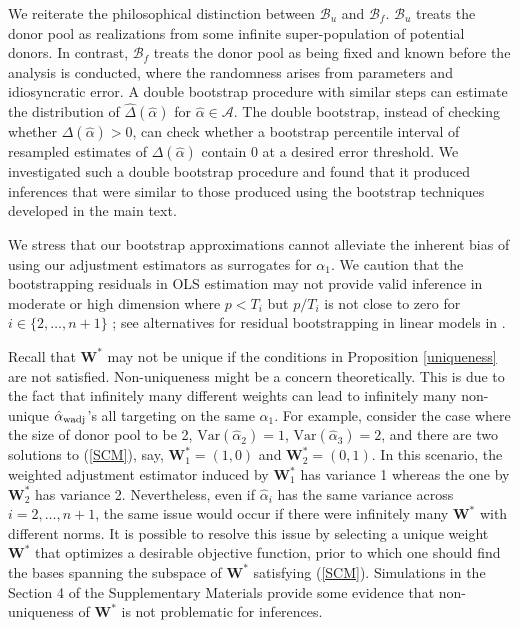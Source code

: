 \documentclass[11pt,3p,review,authoryear]{elsarticle}
\def\mbf#1{\mathbf{#1}} %
\def\mc#1{\mathcal{#1}} %
\def\var#1{\mathrm{Var}(#1)} %
\theoremstyle{definition}
\begin{document}
We reiterate the philosophical distinction between $\mc{B}_u$ and $\mc{B}_f$. $\mc{B}_u$ treats the donor pool as realizations from some infinite super-population of potential donors. In contrast, $\mc{B}_f$ treats the donor pool as being fixed  and known before the analysis is conducted, where the randomness arises from parameters and idiosyncratic error. A double bootstrap procedure with similar steps can estimate the distribution of $\hat\Delta(\hat{\alpha})$ for $\hat{\alpha} \in \mc{A}$. The double bootstrap, instead of checking whether $\Delta(\hat{\alpha})>0$, can check whether a bootstrap percentile interval of resampled estimates of $\Delta(\hat{\alpha})$ contain 0 at a desired error threshold. We investigated such a double bootstrap procedure and found that it produced inferences that were similar to those produced using the bootstrap techniques developed in the main text.

We stress that our bootstrap approximations cannot alleviate the inherent bias of using our adjustment estimators as surrogates for $\alpha_1$. We caution that the bootstrapping residuals in OLS estimation may not provide valid inference in moderate or high dimension where $p < T_i$ but $p / T_i$ is not close to zero for $i\in \{2, \ldots, n+1\}$ \citep{el2018can}; see alternatives for residual bootstrapping in linear models in \citet{el2018can}. 

Recall that $\mathbf{W}^*$  may not be unique if the conditions in Proposition \ref{uniqueness} are not satisfied. Non-uniqueness might be a concern theoretically. This is due to the fact that infinitely many different weights can lead to infinitely many non-unique $\hat{\alpha}_{\rm wadj}$'s all targeting on the same $\alpha_1$. For example, consider the case where the size of  donor pool to be 2, $\var{\hat{\alpha}_2}=1$, $\var{\hat{\alpha}_3}=2$, and there are two solutions to (\ref{SCM}), say, $\mathbf{W}^*_1=(1,0)$ and  $\mathbf{W}^*_2=(0,1)$. In this scenario, the weighted adjustment estimator induced by $\mathbf{W}^*_1$ has variance 1 whereas the one by $\mathbf{W}^*_2$ has variance 2. Nevertheless, even if $\hat{\alpha}_i$ has the same variance across $i = 2, \ldots, n+1$, the same issue would occur if there were infinitely many $\mbf{W}^*$ with different norms. It is possible to resolve this issue by selecting a unique weight $\mbf{W}^*$ that optimizes a desirable objective function, prior to which one should find the bases spanning the subspace of $\mbf{W}^*$ satisfying (\ref{SCM}). Simulations in the Section 4 of the Supplementary Materials provide some evidence that non-uniqueness of $\mathbf{W}^*$ is not problematic for inferences.
\end{document}
